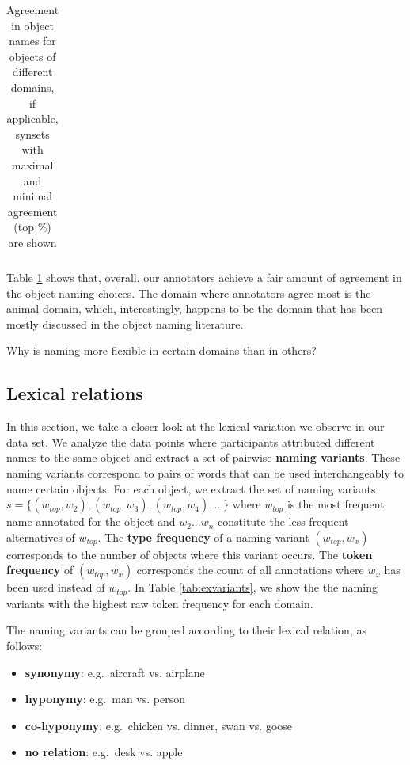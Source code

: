 \documentclass[11pt,a4paper]{article}
\begin{document}
\begin{table}
\begin{tabular}{llll|llll|llll}
\bottomrule
\end{tabular}
\caption{Agreement in object names for objects of different domains, if applicable, synsets with maximal and minimal agreement (top \%) are shown }
\label{tab:agree}
\end{table}

Table \ref{tab:agree} shows that, overall, our annotators achieve a fair amount of agreement in the object naming choices. The domain where annotators agree most is the animal domain, which, interestingly, happens to be the domain that has been mostly discussed in the object naming literature. 

Why is naming more flexible in certain domains than in others?

\subsection{Lexical relations}

In this section, we take a closer look at the lexical variation we observe in our data set. We analyze the data points where participants attributed different names to the same object and extract a set of  pairwise \textbf{naming variants}. These naming variants correspond to pairs of words that can be used interchangeably to name certain objects.
For each object, we extract the set of naming variants $s = \{ (w_{top},w_2), (w_{top},w_3), (w_{top},w_4),... \}$  where $w_{top}$ is the most frequent name annotated for the object and $w_2 ... w_n$ constitute the less frequent alternatives of $w_{top}$.  The  \textbf{type frequency} of a naming variant $(w_{top},w_x)$ corresponds to the number of objects where this variant occurs. The \textbf{token frequency} of $(w_{top},w_x)$ corresponds the count of all annotations where $w_x$ has been used instead of $w_{top}$.
In Table \ref{tab:exvariants}, we show the the naming variants with the highest raw token frequency for each domain. 


The naming variants can be grouped according to their lexical relation, as follows:

\begin{itemize}
\item \textbf{synonymy}: e.g.\ aircraft vs. airplane 
\item \textbf{hyponymy}: e.g.\ man vs. person
\item \textbf{co-hyponymy}: e.g.\ chicken vs. dinner, swan vs. goose
\item \textbf{no relation}: e.g.\  desk vs. apple
\end{itemize}
\end{document}
